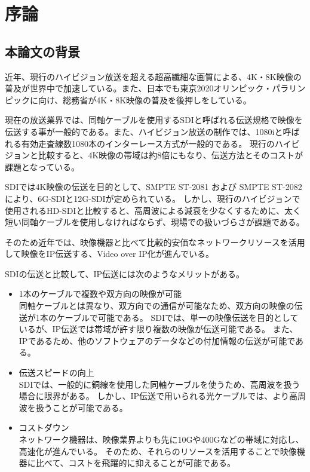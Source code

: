\chapter{序論}
\label{chap:introduction}

\section{本論文の背景}
近年、現行のハイビジョン放送を超える超高繊細な画質による、4K・8K映像の普及が世界中で加速している。また、日本でも東京2020オリンピック・パラリンピックに向け、総務省が4K・8K映像の普及を後押しをしている。

現在の放送業界では、同軸ケーブルを使用するSDIと呼ばれる伝送規格で映像を伝送する事が一般的である。また、ハイビジョン放送の制作では、1080iと呼ばれる有効走査線数1080本のインターレース方式が一般的である。
現行のハイビジョンと比較すると、4K映像の帯域は約8倍にもなり、伝送方法とそのコストが課題となっている。

SDIでは4K映像の伝送を目的として、SMPTE ST-2081 および SMPTE ST-2082により、6G-SDIと12G-SDIが定められている。
しかし、現行のハイビジョンで使用されるHD-SDIと比較すると、高周波による減衰を少なくするために、太く短い同軸ケーブルを使用しなければならず、現場での扱いづらさが課題である。

そのため近年では、映像機器と比べて比較的安価なネットワークリソースを活用して映像をIP伝送する、Video over IP化が進んでいる。

SDIの伝送と比較して、IP伝送には次のようなメリットがある\cite{kodera-interbee2015}。

\begin{itemize}
  \item 1本のケーブルで複数や双方向の映像が可能\mbox{}\\
    同軸ケーブルとは異なり、双方向での通信が可能なため、双方向の映像の伝送が1本のケーブルで可能である。
    SDIでは、単一の映像伝送を目的としているが、IP伝送では帯域が許す限り複数の映像が伝送可能である。
    また、IPであるため、他のソフトウェアのデータなどの付加情報の伝送が可能である。
  \item 伝送スピードの向上\mbox{}\\
    SDIでは、一般的に銅線を使用した同軸ケーブルを使うため、高周波を扱う場合に限界がある。
    しかし、IP伝送で用いられる光ケーブルでは、より高周波を扱うことが可能である。
  \item コストダウン\mbox{}\\
    ネットワーク機器は、映像業界よりも先に10Gや400Gなどの帯域に対応し、高速化が進んでいる。
    そのため、それらのリソースを活用することで映像機器に比べて、コストを飛躍的に抑えることが可能である。
\end{itemize}

